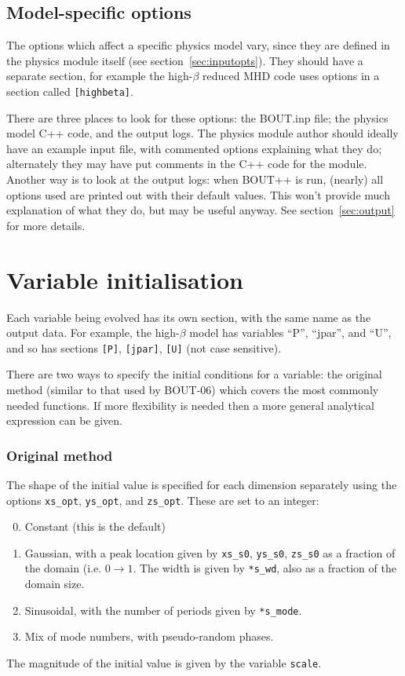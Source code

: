 \documentclass[12pt]{article}
\newcommand{\code}[1]{\texttt{#1}}
\begin{document}
\subsection{Model-specific options}
%
The options which affect a specific physics model vary, since they are defined
in the physics module itself (see section~\ref{sec:inputopts}). They should
have a separate section, for example the high-$\beta$ reduced MHD code uses
options in a section called \code{[highbeta]}.

There are three places to look for these options: the BOUT.inp file; the
physics model C++ code, and the output logs. The physics module author should
ideally have an example input file, with commented options explaining what they
do; alternately they may have put comments in the C++ code for the module.
Another way is to look at the output logs: when BOUT++ is run, (nearly) all
options used are printed out with their default values. This won't provide much
explanation of what they do, but may be useful anyway.  See
section~\ref{sec:output} for more details.





\section{Variable initialisation}
%
%
Each variable being evolved has its own section, with the same name as the
output data. For example, the high-$\beta$ model has variables ``P'', ``jpar'',
and ``U'', and so has sections \code{[P]}, \code{[jpar]}, \code{[U]} (not case
sensitive).

There are two ways to specify the initial conditions for a variable: the
original method (similar to that used by BOUT-06) which covers the most
commonly needed functions. If more flexibility is needed then a more general
analytical expression can be given.


\subsubsection{Original method}
%
The shape of the initial value is specified for each dimension separately using
the options \code{xs\_opt}, \code{ys\_opt}, and \code{zs\_opt}. These are set
to an integer:
%
\begin{enumerate}
\setcounter{enumi}{-1}
\item Constant (this is the default)
\item Gaussian, with a peak location given by \code{xs\_s0}, \code{ys\_s0},
    \code{zs\_s0} as a fraction of the domain (i.e. $0 \rightarrow 1$.  The
    width is given by \code{*s\_wd}, also as a fraction of the domain size.
\item Sinusoidal, with the number of periods given by \code{*s\_mode}.
\item Mix of mode numbers, with pseudo-random phases.
\end{enumerate}
%
The magnitude of the initial value is given by the variable \code{scale}.
\end{document}
